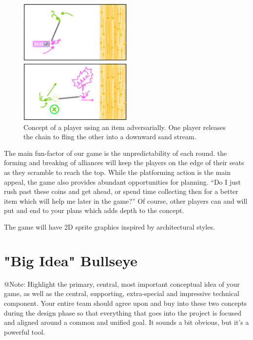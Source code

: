 \begin{figure}[h]
    \centering
    \includegraphics[width=0.5\textwidth]{figures/topmeifyoucan_concept_rope_betrayal.png}
    \caption{Concept of a player using an item adversarially. One player releases the chain to fling the other into a downward sand stream.}
    \label{fig:concept-betrayal}
\end{figure}

The main fun-factor of our game is the unpredictability of each round. the forming and breaking of alliances will keep the players on the edge of their seats as they scramble to reach the top. While the platforming action is the main appeal, the game also provides abundant opportunities for planning. ``Do I just rush past these coins and get ahead, or spend time collecting then for a better item which will help me later in the game?'' Of course, other players can and will put and end to your plans which adds depth to the concept.

The game will have 2D sprite graphics inspired by architectural styles.





\section{"Big Idea" Bullseye}

\begin{TempText}
	@Note: Highlight the primary, central, most important conceptual idea of your game, as well as the central, supporting, extra-special and impressive technical component. Your entire team should agree upon and buy into these two concepts during the design phase so that everything that goes into the project is focused and aligned around a common and unified goal. It sounds a bit obvious, but it's a powerful tool.
\end{TempText}

